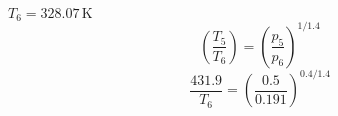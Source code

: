 \( T_6 = 328.07 \, \text{K} \)  
\[ \left( \frac{T_5}{T_6} \right) = \left( \frac{p_5}{p_6} \right)^{1/1.4} \]  
\[ \frac{431.9}{T_6} = \left( \frac{0.5}{0.191} \right)^{0.4/1.4} \]